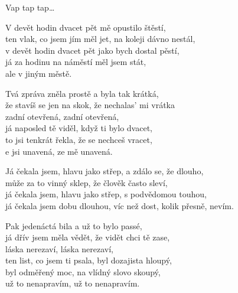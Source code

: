 
\cho{}
Vap tap tap\ldots

\ve{}
V devět hodin dvacet pět mě opustilo štěstí,\\
ten vlak, co jsem jím měl jet, na koleji dávno nestál,\\
v devět hodin dvacet pět jako bych dostal pěstí,\\
já za hodinu na náměstí měl jsem stát,\\
ale v jiným městě.

\re{}
Tvá zpráva zněla prostě a byla tak krátká,\\
že stavíš se jen na skok, že nechalas' mi vrátka\\
zadní otevřená, zadní otevřená,\\
já naposled tě viděl, když ti bylo dvacet,\\
to jsi tenkrát řekla, že se nechceš vracet,\\
e jsi unavená, ze mě unavená.

\cho{}

\ve{}
Já čekala jsem, hlavu jako střep, a zdálo se, že dlouho,\\
může za to vinný sklep, že člověk často sleví,\\
já čekala jsem, hlavu jako střep, s podvědomou touhou,\\
já čekala jsem dobu dlouhou, víc než dost, kolik přesně, nevím.

\re{}
Pak jedenáctá bila a už to bylo passé,\\
já dřív jsem měla vědět, že vidět chci tě zase,\\
láska nerezaví, láska nerezaví,\\
ten list, co jsem ti psala, byl dozajista hloupý,\\
byl odměřený moc, na vlídný slovo skoupý,\\
už to nenapravím, už to nenapravím.

\cho{}

\esong